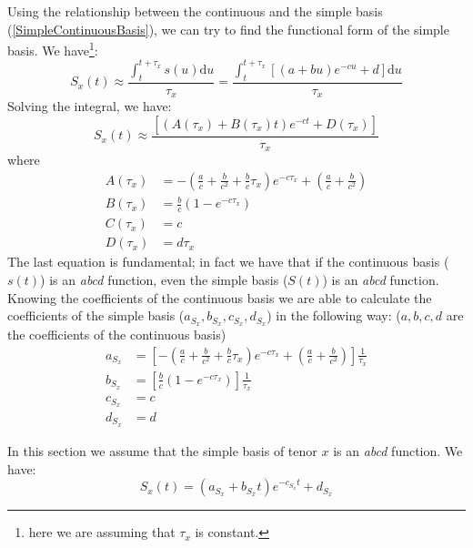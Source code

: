 \documentclass{article}
\begin{document}
\begin{appendices}
Using the relationship between the continuous and the simple basis (\ref{SimpleContinuousBasis}), we can try to find the functional form of the simple basis. We have\footnote{here we are assuming that $\tau_x$ is constant.}:
\begin{equation}
S_x(t) \approx \frac{\int_t^{t+\tau_x} s(u) \mathrm{d}u}{\tau_x} = \frac{\int_t^{t+\tau_x} [(a + b u)e^{-c  u} + d] \mathrm{d}u}{\tau_x}
\end{equation}
Solving the integral, we have:
\begin{equation}
S_x(t) \approx \frac{[(A(\tau_x) + B(\tau_x) t)e^{-c  t} + D(\tau_x)]}{\tau_x}
\end{equation}
where
\begin{equation}\label{eq:integratedCoef}
\begin{split}
A(\tau_x)&=-\left(\frac{a}{c}+ \frac{b}{c^{2}}+\frac{b}{c}\tau_x \right)e^{-c\tau_x}+\left(\frac{a}{c}+ \frac{b}{c^{2}}\right) \\
B(\tau_x)&=\frac{b}{c}\left(1-e^{-c\tau_x}\right) \\
C(\tau_x)&= c \\
D(\tau_x)&=d\tau_x
\end{split}
\end{equation}
The last equation is fundamental; in fact we have that if the continuous basis ($s(t)$) is an \textit{abcd} function, even the simple basis ($S(t)$) is an \textit{abcd} function. Knowing the coefficients of the continuous basis we are able to calculate the coefficients of the simple basis ($a_{S_x},b_{S_x},c_{S_x},d_{S_x}$) in the following way: ($a,b,c,d$ are the coefficients of the continuous basis)
\begin{equation} \label{eq:simpleBasisCoef}
\begin{split}
a_{S_x}&=\left[-\left(\frac{a}{c}+ \frac{b}{c^{2}}+\frac{b}{c}\tau_x \right)e^{-c\tau_x}+\left(\frac{a}{c}+ \frac{b}{c^{2}}\right)\right]\frac{1}{\tau_x} \\
b_{S_x}&=\left[\frac{b}{c}\left(1-e^{-c\tau_x}\right)\right]\frac{1}{\tau_x} \\
c_{S_x}&= c \\
d_{S_x}&= d
\end{split}
\end{equation}

In this section we assume that the simple basis of tenor $x$ is an \textit{abcd} function. We have:
\begin{equation}
S_x(t) = (a_{S_x} + b_{S_x} t)e^{-c_{S_x}  t} + d_{S_x}
\end{equation}




\end{appendices}
\end{document}

